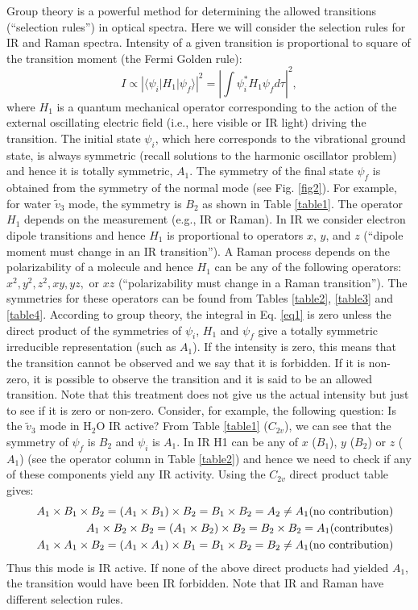 \documentclass[byrevtex,amssymb,aps,pra,floatfix,letterpaper]{revtex4}
\begin{document}
Group theory is a powerful method for determining the allowed transitions (``selection rules'') in optical spectra. Here we will consider the selection rules for IR and Raman spectra. Intensity of a given transition is proportional
to square of the transition moment (the Fermi Golden rule):
\begin{equation}
\label{eq1}
I\propto \left|\langle\psi_i|H_1|\psi_f\rangle\right|^2=\left|\int \psi_i^* H_1 \psi_f d\tau\right|^2,
\end{equation}
where $H_1$ is a quantum mechanical operator corresponding to the action of the external oscillating electric field (i.e., here visible or IR light) driving the transition. The initial state $\psi_i$, which here corresponds to the vibrational ground state, is always symmetric (recall solutions to the harmonic oscillator problem) and hence it is totally symmetric, $A_1$. The symmetry of the final state $\psi_f$ is obtained from the symmetry of the normal mode (see Fig. \ref{fig2}). For example, for water $\tilde{v}_3$ mode, the symmetry is $B_2$ as shown in Table \ref{table1}. The operator $H_1$ depends on the measurement (e.g., IR or Raman). In IR we consider electron dipole transitions and hence $H_1$ is proportional to operators $x$, $y$, and $z$ (``dipole moment must change in an IR transition''). A Raman process depends on the polarizability of a molecule and hence $H_1$ can be any of the following operators: $x^2, y^2, z^2, xy, yz,$ or $xz$ (``polarizability must change in a Raman transition''). The symmetries for these operators can be found from Tables \ref{table2}, \ref{table3} and \ref{table4}. According to group theory, the integral in Eq. \ref{eq1} is zero unless the direct product of the symmetries of $\psi_i$, $H_1$ and $\psi_f$ give a totally symmetric irreducible representation (such as $A_1$). If the intensity is zero, this means that the transition cannot be observed and we say that it is forbidden. If it is non-zero, it is possible
to observe the transition and it is said to be an allowed transition. Note that this treatment does not give us the actual intensity but just to see if it is zero or non-zero. Consider, for example, the following question: Is the  
$\tilde{v}_3$ mode in H$_2$O IR active? From Table \ref{table1} ($C_{2v}$), we can see that the symmetry of $\psi_f$ is $B_2$ and $\psi_i$ is $A_1$. In IR H1 can be any of $x$ ($B_1$), $y$ ($B_2$) or $z$ ($A_1$) (see the operator column in Table \ref{table2}) and hence we need to check if any of these components yield any IR activity. Using the $C_{2v}$ direct product table gives:
\begin{eqnarray}
\label{eq2}
& & A_1\times B_1\times B_2 = (A_1\times B_1)\times B_2 = B_1\times B_2 = A_2 \ne A_1 \textnormal{(no contribution)}\nonumber\\
& & A_1\times B_2\times B_2 = (A_1\times B_2)\times B_2 = B_2\times B_2 = A_1 \textnormal{(contributes)}\\
& & A_1\times A_1\times B_2 = (A_1\times A_1)\times B_1 = B_1\times B_2 = B_2 \ne A_1 \textnormal{(no contribution)}\nonumber
\end{eqnarray}
Thus this mode is IR active. If none of the above direct products had yielded $A_1$, the transition would have been IR forbidden. Note that IR and Raman have different selection rules.
\end{document}
